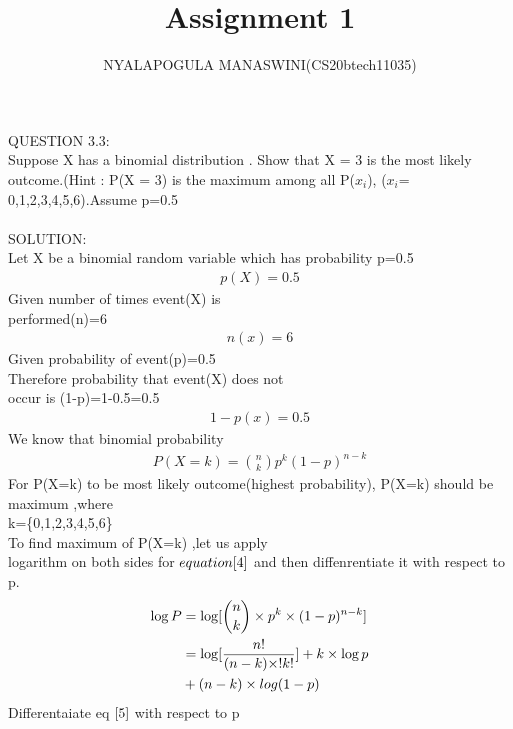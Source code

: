 \documentclass{assignment}
\begin{document}
\title{Assignment 1}
\author{NYALAPOGULA MANASWINI(CS20btech11035)}
\maketitle
\begin{multicols}{2}

QUESTION 3.3:\\
Suppose X has a binomial
 distribution . Show that X = 3 is the most likely outcome.(Hint : P(X = 3) is the maximum among all P($x_i$), ($x_i$= 0,1,2,3,4,5,6).Assume p=0.5\\ 
 \\
SOLUTION:\\
Let X be a binomial random variable which has probability p=0.5\\
 \begin{align}
 p(X)=0.5 \label{1}
 \end{align}
Given number of times event(X) is\\
 performed(n)=6\\
 \begin{align}
 n(x)=6 \label{2}
 \end{align}
Given probability of event(p)=0.5\\
Therefore probability that event(X) does not \\occur is
(1-p)=1-0.5=0.5\\
 \begin{align}
1-p(x)=0.5 \label{3}
 \end{align}
We know that binomial probability\\
\begin{align}
P(X=k)= \binom{n}{k}p^k({1-p})^{n-k}  \label{4} 
\end{align}
For P(X=k) to be most likely outcome(highest probability),
P(X=k) should be maximum ,where\\
 k=\{0,1,2,3,4,5,6\}\\
To find maximum of P(X=k) ,let us  apply \\logarithm on both sides for $equation\eqref{4}$ and then diffenrentiate it with respect
to p.
\begin{align}
\log P&=\log[\binom{n}{k}\times p^k\times ({1-p})^{n-k}]  \\
&=\log[\frac{n!}{(n-k)\times !k!}]+k \times \log p \notag \\
 &+(n-k)\times log (1-p) \label{5}
\end{align}
Differentaiate eq $\eqref{5}$ with respect to p


\end{multicols}
\end{document}
